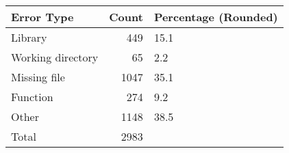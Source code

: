 \begin{tabular}{lrl}
\toprule
       Error Type &  Count & Percentage (Rounded) \\
\midrule
          Library &    449 &                 15.1 \\
Working directory &     65 &                  2.2 \\
     Missing file &   1047 &                 35.1 \\
         Function &    274 &                  9.2 \\
            Other &   1148 &                 38.5 \\
            Total &   2983 &                      \\
\bottomrule
\end{tabular}
